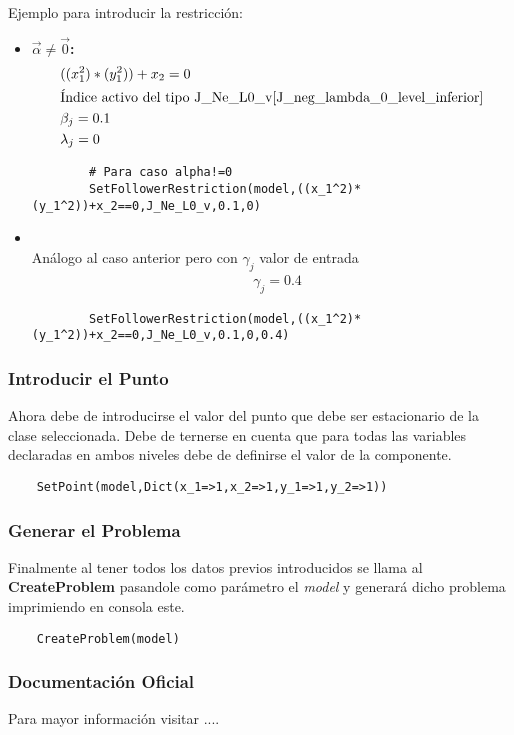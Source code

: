 \begin{itemize}
Ejemplo para introducir la restricción:

\begin{itemize}
    \item \textbf{$\vec{\alpha}\neq \vec{0}$:}\\
    \begin{align*}
        &((x_1^2)*(y_1^2))+x_2=0\\
        &\text{Índice activo del tipo J\_Ne\_L0\_v} \refeq{J_neg_lambda_0_level_inferior}\\
        & \beta_j=0.1\\
        & \lambda_j=0 \\
    \end{align*}
    \begin{lstlisting}
        # Para caso alpha!=0
        SetFollowerRestriction(model,((x_1^2)*(y_1^2))+x_2==0,J_Ne_L0_v,0.1,0)
    \end{lstlisting}
    \item {}\\
    
    Análogo al caso anterior pero con $\gamma_j$ valor de entrada
    \begin{align*}
        &\gamma_j=0.4
    \end{align*}
    \begin{lstlisting}
        SetFollowerRestriction(model,((x_1^2)*(y_1^2))+x_2==0,J_Ne_L0_v,0.1,0,0.4)
    \end{lstlisting}
\end{itemize}

\end{itemize}


\subsubsection{Introducir el Punto}
Ahora debe de introducirse el valor del punto que debe ser estacionario de la clase seleccionada.
Debe de ternerse en cuenta que para todas las variables declaradas en ambos niveles debe de definirse el valor de la componente.

\begin{lstlisting}
    SetPoint(model,Dict(x_1=>1,x_2=>1,y_1=>1,y_2=>1))
\end{lstlisting}

\subsubsection{Generar el Problema}
Finalmente al tener todos los datos previos introducidos se llama al \textbf{CreateProblem} pasandole como parámetro el \textit{model} 
y generará dicho problema imprimiendo en consola este.

\begin{lstlisting}
    CreateProblem(model)
\end{lstlisting}


\subsubsection{Documentación Oficial}
Para mayor información visitar ....
